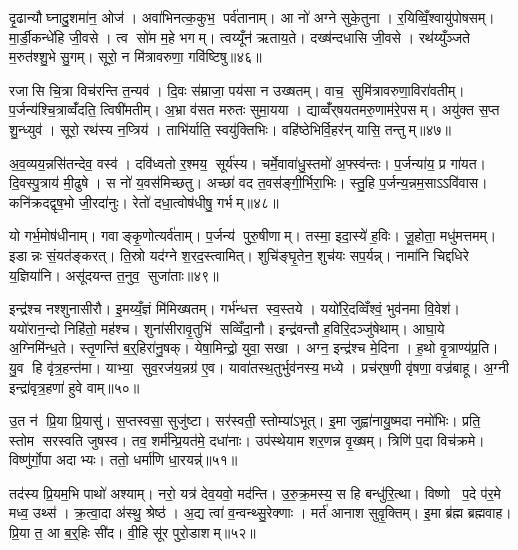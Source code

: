 दृ॒ढान्यौघ्नादु॒शमा॑न॒ ओज॑। अवा॑भिनत्क॒कुभ॒ पर्व॑तानाम्। आ नो॑ अग्ने सुके॒तुना। र॒यिव्विँ॒श्वायु॑पोषसम्। मा॒र्डी॒कन्धे॑हि जी॒वसे। त्व सो॑म म॒हे भगम्। त्वय्यूँन॑ ऋताय॒ते। दख्ष॑न्दधासि जी॒वसे। रथ॑य्युँञ्जते म॒रुत॑श्शु॒भे सु॒गम्। सूरो॒ न मि॑त्रावरुणा॒ गवि॑ष्टिषु॥४६॥

रजासि चि॒त्रा विच॑रन्ति त॒न्यव॑। दि॒वः स॑म्राजा॒ पय॑सा न उख्षतम्। वाच॒ सुमि॑त्रावरुणा॒विरा॑वतीम्। प॒र्जन्य॑श्चि॒त्राव्वँ॑दति॒ त्विषी॑मतीम्। अ॒भ्रा व॑सत मरुतः सुमा॒यया। द्याव्वँ॑र्‌षयतमरु॒णाम॑रे॒पसम्। अयु॑क्त स॒प्त शु॒न्ध्युव॑। सूरो॒ रथ॑स्य न॒प्त्रिय॑। ताभि॑र्याति॒ स्वयु॑क्तिभिः। वहि॑ष्ठेभिर्\mbox{}वि॒हर॑न् यासि॒ तन्तुम्॥४७॥

अ॒व॒व्यय॒न्नसि॑तन्देव॒ वस्व॑। दवि॑ध्वतो र॒श्मय॒ सूर्य॑स्य। चर्मे॒वावा॑धु॒स्तमो॑ अ॒फ्स्व॑न्तः। प॒र्जन्या॑य॒ प्र गा॑यत। दि॒वस्पु॒त्राय॑ मी॒ढुषे। स नो॑ य॒वस॑मिच्छतु। अच्छा॑ वद त॒वस॑ङ्गी॒र्भिरा॒भिः। स्तु॒हि प॒र्जन्य॒न्नम॒साऽऽवि॑वास। कनि॑क्रदद्वृष॒भो जी॒रदा॑नुः। रेतो॑ दधा॒त्वोष॑धीषु॒ गर्भम्॥४८॥

यो गर्भ॒मोष॑धीनाम्। गवाङ्कृ॒णोत्यर्व॑ताम्। प॒र्जन्य॑ पुरु॒षीणाम्। तस्मा॒ इदा॒स्ये॑ ह॒विः। जू॒होता॒ मधु॑मत्तमम्। इडान्नः सं॒यत॑ङ्करत्। ति॒स्रो यद॑ग्ने श॒रद॒स्त्वामित्। शुचि॑ङ्घृ॒तेन॒ शुच॑यः सप॒र्यन्न्। नामा॑नि चिद्दधिरे य॒ज्ञिया॑नि। असू॑दयन्त त॒नुव॒ सुजा॑ताः॥४९॥

इन्द्र॑श्च नश्शुनासीरौ। इ॒मय्यँ॒ज्ञं मि॑मिख्षतम्। गर्भ॑न्धत्त स्व॒स्तये। ययो॑रि॒दव्विँश्वं॒ भुव॑नमा वि॒वेश॑। ययो॑रान॒न्दो निहि॑तो॒ मह॑श्च। शुना॑सीरावृ॒तुभि॑ सव्विँदा॒नौ। इन्द्र॑वन्तौ ह॒विरि॒दञ्जु॑षेथाम्। आघा॒ये अ॒ग्निमि॑न्ध॒ते। स्तृ॒णन्ति॑ ब॒र्॒हिरा॑नु॒षक्। येषा॒मिन्द्रो॒ युवा॒ सखा। अग्न॒ इन्द्र॑श्च मे॒दिना। ह॒थो वृ॒त्राण्य॑प्र॒ति। यु॒व हि वृ॑त्र॒हन्त॑मा। याभ्या॒ सुव॒रज॑य॒न्नग्र॑ ए॒व। यावा॑तस्थ॒तुर्भुव॑नस्य॒ मध्ये। प्रच॑र्‌ष॒णी वृ॑षणा॒ वज्र॑बाहू। अ॒ग्नी इन्द्रा॑वृत्र॒हणा॑ हुवे वाम्॥५०॥\anuvakamend[मन॒ इन्द्रो॒ गवि॑ष्टिषु॒ तन्तु॒ङ्गर्भ॒ सुजा॑ता॒ सखा॑ स॒प्त च॑]

उ॒त न॑ प्रि॒या प्रि॒यासु॑। स॒प्तस्वसा॒ सुजु॑ष्टा। सर॑स्वती॒ स्तोम्या॑ऽभूत्। इ॒मा जुह्वा॑नायु॒ष्मदा नमो॑भिः। प्रति॒ स्तोम सरस्वति जुषस्व। तव॒ शर्म॑न्प्रि॒यत॑मे॒ दधा॑नाः। उप॑स्थेयाम शर॒णन्न वृ॒ख्षम्। त्रिणि॑ प॒दा विच॑क्रमे। विष्णु॑र्गो॒पा अदाभ्यः। ततो॒ धर्मा॑णि धा॒रयन्न्॑॥५१॥

तद॑स्य प्रि॒यम॒भि पाथो॑ अश्याम्। नरो॒ यत्र॑ देव॒यवो॒ मद॑न्ति। उ॒रु॒क्र॒मस्य॒ स हि बन्धु॑रि॒त्था। विष्णो प॒दे प॑र॒मे मध्व॒ उथ्स॑। क्र॒त्वा॒दा अ॑स्थु॒ श्रेष्ठ॑। अ॒द्य त्वा॑ व॒न्वन्थ्सु॒रेक्णाः। मर्त॑ आनाश सुवृ॒क्तिम्। इ॒मा ब्र॑ह्म ब्रह्मवाह। प्रि॒या त॒ आ ब॒र्॒हिः सी॑द। वी॒हि सू॑र पुरो॒डाशम्॥५२॥

